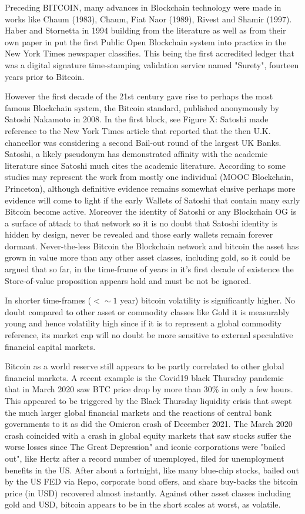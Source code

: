 \documentclass[final,5p,times,twocolumn,authoryear]{elsarticle}
\begin{document}
Preceding BITCOIN, many advances in Blockchain technology were made in works like Chaum (1983), Chaum, Fiat Naor (1989), Rivest and Shamir (1997). Haber and Stornetta in 1994 building from the literature as well as from their own paper in \cite{Haber1991wi} put the first Public Open Blockchain system into practice in the New York Times newspaper classifies. This being the first accredited ledger that was a digital signature time-stamping validation service named "Surety", fourteen years prior to Bitcoin. 

However the first decade of the 21st century gave rise to perhaps the most famous Blockchain system, the Bitcoin standard, published anonymously by Satoshi Nakamoto in 2008.  In the first block, see Figure X: Satoshi made reference to the New York Times article that reported that the then U.K. chancellor was considering a second Bail-out round of the largest UK Banks. Satoshi, a likely pseudonym has demonstrated affinity with the academic literature since Satoshi much cites the academic literature. According to some studies may represent the work from mostly one individual (MOOC Blockchain, Princeton), although definitive evidence remains somewhat elusive perhaps more evidence will come to light if the early Wallets of Satoshi that contain many early Bitcoin become active. Moreover the identity of Satoshi or any Blockchain OG is a surface of attack to that network so it is no doubt that Satoshi identity is hidden by design, never be revealed and those early wallets remain forever dormant. Never-the-less Bitcoin the Blockchain network and bitcoin the asset has grown in value more than any other asset classes, including gold, so it could be argued that so far, in the time-frame of years in it's first decade of existence the Store-of-value proposition appears hold and must be not be ignored.

In shorter time-frames ($\lt \sim 1$ year) bitcoin volatility is significantly higher. No doubt compared to other asset or commodity classes like Gold it is measurably young and hence volatility high since if it is to represent a global commodity reference, its market cap will no doubt be more sensitive to external speculative financial capital markets. 

Bitcoin as a world reserve still appears to be partly correlated to other global financial markets. A recent example is the Covid19 black Thursday pandemic that in March 2020 saw BTC price drop by more than 30\% in only a few hours. This appeared to be triggered by the Black Thursday liquidity crisis that swept the much larger global financial markets and the reactions of central bank governments to it as did the Omicron crash of December 2021. The March 2020 crash coincided with a crash in global equity markets that saw stocks suffer the worse losses since The Great Depression" and iconic corporations were "bailed out", like Hertz after a record number of unemployed, filed for unemployment benefits in the US. After about a fortnight, like many blue-chip stocks, bailed out by the US FED via Repo, corporate bond offers, and share buy-backs the bitcoin price (in USD) recovered almost instantly. Against other asset classes including gold and USD, bitcoin appears to be in the short scales at worst, as volatile. 
 
\end{document}
